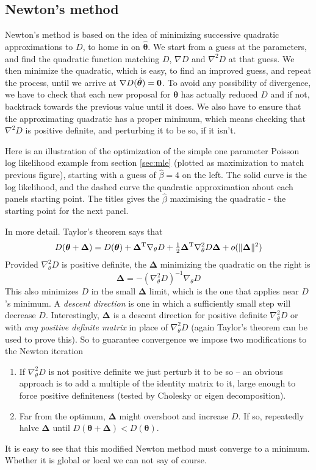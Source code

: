 \documentclass[10pt] {article}
\newcommand{\grad}{\nabla}
\newcommand{\ts}{^{\rm T}}
\newcommand{\eps}[3]
{{\begin{center}
 \rotatebox{#1}{\scalebox{#2}{\texttt{[image: \#3]}}}
 \end{center}}
}
\theoremstyle{definition}
\begin{document}
\subsection{Newton's method}

Newton's method is based on the idea of minimizing successive quadratic approximations to $D$, to home in on    $\hat {\bm \theta}$. We start from a guess at the parameters, and find the quadratic function matching $D$, $\nabla D$ and $\nabla^2 D$ at that guess. We then minimize the quadratic, which is easy, to find an improved guess, and repeat the process, until we arrive at $\nabla D(\hat {\bm \theta}) = {\bf 0}$. To avoid any possibility of divergence, we have to check that each new proposal for $\bm \theta$ has actually reduced $D$ and if not, backtrack towards the previous value until it does. We also have to ensure that the approximating quadratic has a proper minimum, which means checking that  $\nabla^2 D$ is positive definite, and perturbing it to be so, if it isn't. 

Here is an illustration of the optimization of the simple one parameter Poisson log likelihood example from section \ref{sec:mle} (plotted as maximization to match previous figure), starting with a guess of $\hat \beta = 4$ on the left. The solid curve is the log likelihood, and the dashed curve the quadratic approximation about each panels starting point. The titles gives the $\hat \beta$ maximising the quadratic - the starting point for the next panel.     

\eps{0}{.6}{fig-newton-fig-1.pdf}

\noindent In more detail. Taylor's theorem says that 
$$
D({\bm \theta} + {\bm \Delta}) = D({\bm \theta}) + {\bm \Delta}\ts \grad_\theta D  + \tfrac{1}{2} {\bm \Delta} \ts \grad_\theta^2 D {\bm \Delta} + o(\|{\bm \Delta}\|^2)
$$
Provided $\grad_\theta^2 D$ is positive definite, the $\bm \Delta $ minimizing the quadratic on the right is  
$$
{\bm \Delta} = -(\grad_\theta^2 D)^{-1} \grad_\theta D
$$
This also minimizes $D$ in the small $\bm \Delta $ limit, which is the one that applies near $D$'s minimum. A {\em descent direction} is one in which a sufficiently small step will decrease $D$. Interestingly, ${\bm \Delta}$ is a descent direction for positive definite $\grad_\theta^2 D$ or with {\em any positive definite matrix} in place of $\grad_\theta^2 D$ (again Taylor's theorem can be used to prove this). So to guarantee convergence we impose two modifications to the Newton iteration
\begin{enumerate} 
\item If $\grad_\theta^2 D$ is not positive definite we just perturb it to be so -- an obvious approach is to add a multiple of the identity matrix to it, large enough to force positive definiteness (tested by Cholesky or eigen decomposition).
\item Far from the optimum, $\bm \Delta$ might overshoot and increase $D$. If so, repeatedly halve $\bm \Delta$ until $D({\bm \theta} + {\bm \Delta})<D({\bm \theta})$. 
\end{enumerate}
It is easy to see that this modified Newton method must converge to a minimum. Whether it is global or local we can not say of course.  
\end{document}
